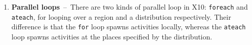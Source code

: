 \documentclass[10pt]{article}
\numberwithin{equation}{section}
\def\Xten{{\sf X10}}
\begin{document}
\begin{enumerate}


\item{\bf Parallel loops}~--~There are two kinds of parallel loop in \Xten{}: {\tt foreach} and {\tt ateach}, for looping over a region and a distribution respectively. Their difference is that the {\tt for} loop spawns activities locally, whereas the {\tt ateach} loop spawns activities at the places specified by the distribution. 



\end{enumerate}
\end{document}
